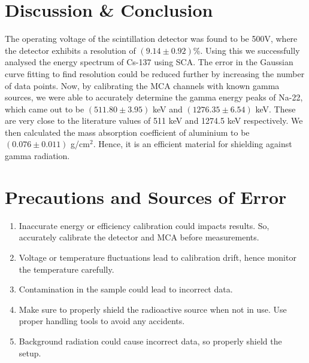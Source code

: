 \section{Discussion \& Conclusion}

The operating voltage of the scintillation detector was found to be 500V, where the detector exhibits a resolution of
$(9.14 \pm 0.92)$\%. Using this we successfully analysed the energy spectrum of Cs-137 using SCA.
The error in the Gaussian curve fitting to find resolution could be reduced
further by increasing the number of data points.
Now, by calibrating the MCA channels with
known gamma sources, we were able to accurately
determine the gamma energy peaks of Na-22, which came out to be $(511.80 \pm 3.95)$ keV and $(1276.35 \pm 6.54)$ keV. These are very close to the literature values of 511 keV and 1274.5 keV respectively.
We then calculated the mass absorption coefficient of aluminium to be $(0.076 \pm 0.011)$ g/cm$^2$. Hence, it is an efficient material for shielding against gamma radiation.

\section{Precautions and Sources of Error}  

    \begin{enumerate}
        \item Inaccurate energy or efficiency calibration could impacts results. So, accurately calibrate
        the detector and MCA before measurements.
        \item Voltage or temperature fluctuations lead to calibration drift, hence monitor the temperature carefully.
        \item Contamination in the sample could lead to incorrect data.
        \item Make sure to properly shield the radioactive source when not in use. Use proper handling tools to avoid any accidents.
        \item Background radiation could cause incorrect data, so properly shield the setup.
    \end{enumerate}
